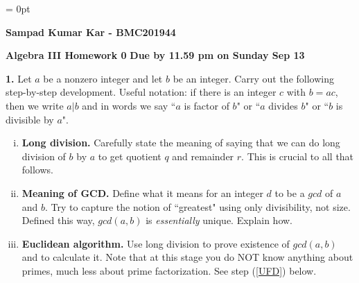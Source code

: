 \documentclass{article}
\begin{document}
\parindent = 0pt
{\centerline {\bf Sampad Kumar Kar - BMC201944}}

\medskip

{\bf Algebra III Homework 0} 
\hfill {\bf Due by 11.59 pm on Sunday Sep 13}

\bigskip 
\bigskip

{\bf 1.}  Let $a$ be a nonzero integer and let $b$ be an integer. Carry out the following step-by-step development. Useful notation: if there is an integer $c$ with $b = ac$, then we write $a|b$ and in words we say ``$a$ is factor of $b$" or ``$a$ divides $b$" or ``$b$ is divisible by $a$". 
\bigskip
\begin{enumerate}[(i)]

    \item {\bf Long division.} Carefully state the meaning of saying that we can do long division of $b$ by $a$ to get quotient $q$ and remainder $r$. This is crucial to all that follows.

\bigskip
    \item {\bf Meaning of GCD.} Define what it means for an integer $d$ to be a $gcd$ of $a$ and $b$. Try to capture the notion of ``greatest" using only divisibility, not size. Defined this way, $gcd(a,b)$ is {\it essentially} unique. Explain how.

\bigskip
    \item {\bf Euclidean algorithm.} Use long division to prove existence of $gcd(a,b)$ and to calculate it. Note that at this stage you do NOT know anything about primes, much less about prime factorization. See step (\ref{UFD}) below.


\end{enumerate}
\end{document}
